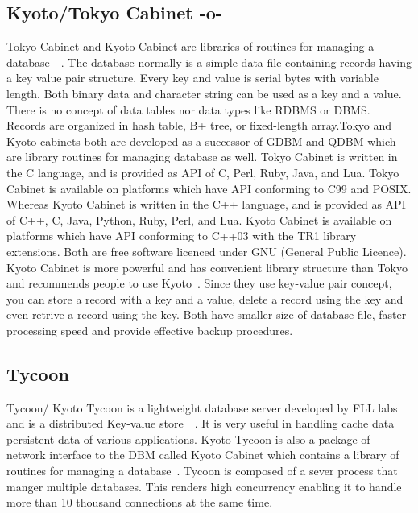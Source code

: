      \pv

\subsection{Kyoto/Tokyo Cabinet -o-}

Tokyo Cabinet and Kyoto Cabinet are libraries of routines for managing
a database~\cite{www-tokyo-cabinet}~\cite{www-kyoto-cabinet}.  The
database normally is a simple data file containing records having a
key value pair structure. Every key and value is serial bytes with
variable length. Both binary data and character string can be used as
a key and a value. There is no concept of data tables nor data types
like RDBMS or DBMS. Records are organized in hash table, B+ tree, or
fixed-length array.Tokyo and Kyoto cabinets both are developed as a
successor of GDBM and QDBM which are library routines for managing
database as well. Tokyo Cabinet is written in the C language, and is
provided as API of C, Perl, Ruby, Java, and Lua. Tokyo Cabinet is
available on platforms which have API conforming to C99 and
POSIX. Whereas Kyoto Cabinet is written in the C++ language, and is
provided as API of C++, C, Java, Python, Ruby, Perl, and Lua. Kyoto
Cabinet is available on platforms which have API conforming to C++03
with the TR1 library extensions. Both are free software licenced under
GNU (General Public Licence). Kyoto Cabinet is more powerful and has
convenient library structure than Tokyo and recommends people to use
Kyoto~\cite{www-tokyo-cabinet}. Since they use key-value pair concept,
you can store a record with a key and a value, delete a record using
the key and even retrive a record using the key. Both have smaller
size of database file, faster processing speed and provide effective
backup procedures.

     \pv

     
\subsection{Tycoon}

Tycoon/ Kyoto Tycoon is a lightweight database server developed by FLL
labs and is a distributed Key-value
store~\cite{www-cloufare-tycoon}~\cite{www-fallabs-tycoon}.  It is
very useful in handling cache data persistent data of various
applications. Kyoto Tycoon is also a package of network interface to
the DBM called Kyoto Cabinet which contains a library of routines for
managing a database~\cite{www-fallabs-kyoto}. Tycoon is composed of a
sever process that manger multiple databases. This renders high
concurrency enabling it to handle more than 10 thousand connections at
the same time.


